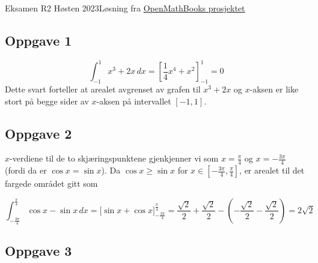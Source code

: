 





{\Large Eksamen R2 Høsten 2023\hfill {\footnotesize Løsning fra \color{blue} \href{https://sindreheggen.wordpress.com/}{OpenMathBooks prosjektet}}}	
\subsection*{Oppgave 1}	
\[ \int_{-1}^{1}x^3+2x\,dx = \left[\frac{1}{4}x^4+x^2\right]_{-1}^1 = 0 \]
Dette svart forteller at arealet avgrenset av grafen til $ x^3+2x $ og $ x $-aksen er like stort på begge sider av $ x $-aksen på intervallet $ [-1, 1] $.

\subsection*{Oppgave 2}
$ x $-verdiene til de to skjæringspunktene gjenkjenner vi som $ x=\frac{\pi}{4} $ og $ x=-\frac{3\pi}{4} $ (fordi da er $ \cos x =\sin x $). Da $ \cos x\geq \sin x $ for $ x\in\left[-\frac{3\pi}{4}, \frac{\pi}{4}\right] $, er arealet til det fargede området gitt som

\[ \int_{-\frac{3\pi}{4}}^{\frac{\pi}{4}} \cos x-\sin x \,dx =\Big[\sin x + \cos x\Big]_{-\frac{3\pi}{4}}^{\frac{\pi}{4}}=\frac{\sqrt{2}}{2}+\frac{\sqrt{2}}{2}-\left(-\frac{\sqrt{2}}{2}-\frac{\sqrt{2}}{2}\right)=2\sqrt{2} \]

\subsection*{Oppgave 3}
\newpage
